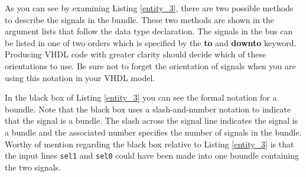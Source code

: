 As you can see by examining Listing \ref{entity_3}, there are two possible methods to describe the signals in the bundle. These two methods are shown in the argument lists that follow the data type declaration. The signals in the bus can be listed in one of two orders which is specified by the \textbf{to} and \textbf{downto} keyword. Producing VHDL code with greater clarity should decide which of these orientations to use. Be sure not to forget the orientation of signals when you are using this notation in your VHDL model.

In the black box of Listing \ref{entity_3} you can see the formal notation for a boundle. Note that the black box uses a slash-and-number notation to indicate that the signal is a bundle. The slash across the signal line indicates the signal is a bundle and the associated number specifies the number of signals in the bundle. Worthy of mention regarding the black box relative to Listing \ref{entity_3} is that the input lines \texttt{sel1} and \texttt{sel0} could have been made into one boundle containing the two signals.

